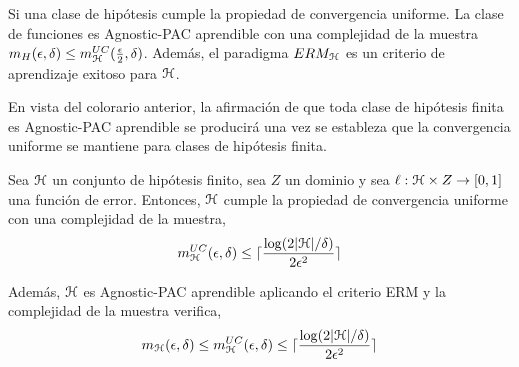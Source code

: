     \begin{corolario}\label{corolario:APAC-UC}
       Si una clase de hipótesis cumple la propiedad de convergencia uniforme. La clase de funciones es Agnostic-PAC aprendible con una complejidad de la muestra ${m_{H}(\epsilon,\delta) \leq m_{\mathcal{H}}^{UC}(\frac{\epsilon}{2},\delta)}$. Además, el paradigma $ERM_{\mathcal{H}}$ es un criterio de aprendizaje exitoso para $\mathcal{H}$. 
    \end{corolario}
   
   
   \begin{observacion}
   En vista del colorario anterior, la afirmación de que toda clase de hipótesis finita es Agnostic-PAC aprendible se producirá una vez se estableza que la convergencia uniforme se mantiene para clases de hipótesis finita. \\
   \end{observacion}
   
   
   \begin{proposicion}
   Sea $\mathcal{H}$ un conjunto de hipótesis finito, sea $Z$ un dominio y sea ${\ell:\mathcal{H} \times Z \to [0,1]}$ una función de error. Entonces, $\mathcal{H}$ cumple la propiedad de convergencia uniforme con una complejidad de la muestra,
   \begin{equation}
       m_{\mathcal{H}}^{UC}(\epsilon,\delta) \leq \lceil \frac{\log(2|\mathcal{H}|/\delta)}{2\epsilon^2} \rceil
   \end{equation}
   
   Además, $\mathcal{H}$ es Agnostic-PAC aprendible aplicando el criterio ERM y la complejidad de la muestra verifica,
   \begin{equation}
        m_{\mathcal{H}}(\epsilon,\delta) \leq  m_{\mathcal{H}}^{UC}(\epsilon,\delta) \leq \lceil \frac{\log(2|\mathcal{H}|/\delta)}{2\epsilon^2} \rceil
   \end{equation}
   \end{proposicion}

